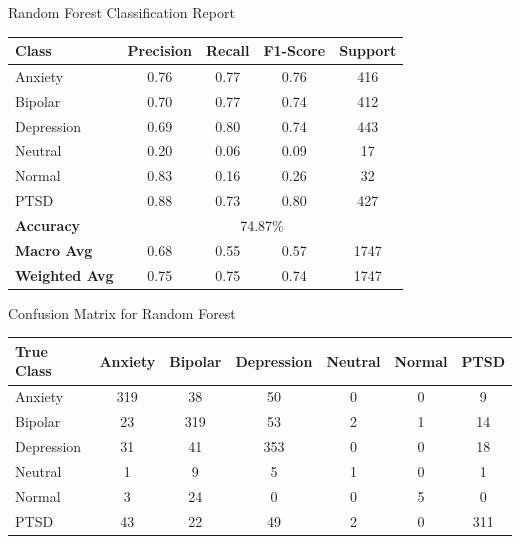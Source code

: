 \begin{center}
    \caption{Random Forest Classification Report}
\begin{tabular}{|l|c|c|c|c|}
\hline
\textbf{Class} & \textbf{Precision} & \textbf{Recall} & \textbf{F1-Score} & \textbf{Support} \\ \hline
Anxiety        & 0.76               & 0.77            & 0.76              & 416              \\ \hline
Bipolar        & 0.70               & 0.77            & 0.74              & 412              \\ \hline
Depression     & 0.69               & 0.80            & 0.74              & 443              \\ \hline
Neutral        & 0.20               & 0.06            & 0.09              & 17               \\ \hline
Normal         & 0.83               & 0.16            & 0.26              & 32               \\ \hline
PTSD           & 0.88               & 0.73            & 0.80              & 427              \\ \hline
\textbf{Accuracy} & \multicolumn{4}{|c|}{74.87\%} \\ \hline
\textbf{Macro Avg} & 0.68            & 0.55            & 0.57              & 1747             \\ \hline
\textbf{Weighted Avg} & 0.75         & 0.75            & 0.74              & 1747             \\ \hline
\end{tabular}

\vspace{0.25in}

\caption{Confusion Matrix for Random Forest}
\begin{tabular}{|l|c|c|c|c|c|c|}
\hline
\textbf{True Class} & \textbf{Anxiety} & \textbf{Bipolar} & \textbf{Depression} & \textbf{Neutral} & \textbf{Normal} & \textbf{PTSD} \\ \hline
Anxiety             & 319              & 38               & 50                  & 0                & 0               & 9             \\ \hline
Bipolar             & 23               & 319              & 53                  & 2                & 1               & 14            \\ \hline
Depression          & 31               & 41               & 353                 & 0                & 0               & 18            \\ \hline
Neutral             & 1                & 9                & 5                   & 1                & 0               & 1             \\ \hline
Normal              & 3                & 24               & 0                   & 0                & 5               & 0             \\ \hline
PTSD                & 43               & 22               & 49                  & 2                & 0               & 311           \\ \hline
\end{tabular}    
\end{center}

